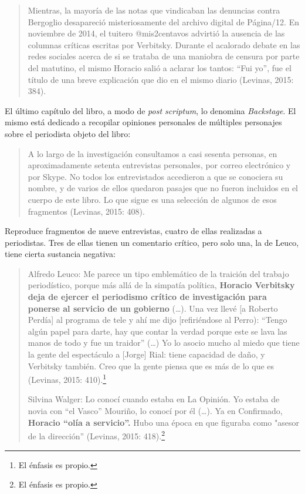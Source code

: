 {\begin{quote}
Mientras, la mayoría de las notas que vindicaban las denuncias contra Bergoglio desapareció misteriosamente del archivo digital de Página/12. En noviembre de 2014, el tuitero @mis2centavos advirtió la ausencia de las columnas críticas escritas por Verbitsky. Durante el acalorado debate en las redes sociales acerca de si se trataba de una maniobra de censura por parte del matutino, el mismo Horacio salió a aclarar los tantos: ``Fui yo'', fue el título de una breve explicación que dio en el mismo diario (Levinas, 2015: 384).
\end{quote}

El último capítulo del libro, a modo de \emph{post scriptum}, lo denomina \emph{Backstage}. El mismo está dedicado a recopilar opiniones personales de múltiples personajes sobre el periodista objeto del libro:

\begin{quote}
A lo largo de la investigación consultamos a casi sesenta personas, en aproximadamente setenta entrevistas personales, por correo electrónico y por Skype. No todos los entrevistados accedieron a que se conociera su nombre, y de varios de ellos quedaron pasajes que no fueron incluidos en el cuerpo de este libro. Lo que sigue es una selección de algunos de esos fragmentos (Levinas, 2015: 408).
\end{quote}

Reproduce fragmentos de nueve entrevistas, cuatro de ellas realizadas a periodistas. Tres de ellas tienen un comentario crítico, pero solo una, la de Leuco, tiene cierta sustancia negativa:

\begin{quote}
Alfredo Leuco: Me parece un tipo emblemático de la traición del trabajo periodístico, porque más allá de la simpatía política, \textbf{Horacio Verbitsky deja de ejercer el periodismo crítico de investigación para ponerse al servicio de un gobierno} (\ldots). Una vez llevé {[}a Roberto Perdía{]} al programa de tele y ahí me dijo {[}refiriéndose al Perro): ``Tengo algún papel para darte, hay que contar la verdad porque este se lava las manos de todo y fue un traidor'' (\ldots) Yo lo asocio mucho al miedo que tiene la gente del espectáculo a {[}Jorge{]} Rial: tiene capacidad de daño, y Verbitsky también. Creo que la gente piensa que es más de lo que es (Levinas, 2015: 410).\footnote{El énfasis es propio.}

Silvina Walger: Lo conocí cuando estaba en La Opinión. Yo estaba de novia con ``el Vasco'' Mouriño, lo conocí por él (\ldots). Ya en Confirmado, \textbf{Horacio ``olía a servicio''.} Hubo una época en que figuraba como "asesor de la dirección'' (Levinas, 2015: 418).\footnote{El énfasis es propio.}


\end{quote}}
